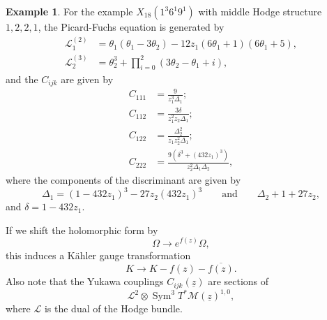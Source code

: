 \documentclass[10pt]{amsart}
\theoremstyle{definition}
\newtheorem{exm}[thm]{Example}
\theoremstyle{remark}
\theoremstyle{plain}
\theoremstyle{definition}
\theoremstyle{remark}
\newcommand{\mc}[1]{\mathcal{#1}}
\newcommand{\uz}{\ul{z}}
\newcommand{\on}[1]{\operatorname{#1}}
\newcommand{\ol}[1]{\overline{#1}}
\newcommand{\ul}[1]{\underline{#1}}
\newcommand{\1}{\mathbf{1}}
\newcommand{\2}{\mathbf{2}}
\newcommand{\3}{\mathbf{3}}
\begin{document}
\begin{exm}
    For the example $X_{18}(1^3 6^1 9^1)$ with middle Hodge structure $1,2,2,1$, the Picard-Fuchs equation is generated by
    \begin{align*}
        \mc{L}_1^{(2)} &= \theta_1 (\theta_1 - 3 \theta_2) - 12 z_1 (6 \theta_1 + 1) (6 \theta_1 + 5), \\
        \mc{L}_2^{(3)} &= \theta_2^3 + \prod_{i=0}^2 (3 \theta_2 - \theta_1 + i),
    \end{align*}
    and the $C_{ijk}$ are given by
    \begin{align*}
        C_{111} &= \frac{9}{z_1^3\Delta_1}; \\
        C_{112} &= \frac{3 \delta}{z_1^2 z_2 \Delta_1}; \\
        C_{122} &= \frac{\Delta_2^2}{z_1 z_2^2 \Delta_1}; \\
        C_{222} &= \frac{9(\delta^3 + (432z_1)^3)}{z_2^2 \Delta_1 \Delta_2},
    \end{align*}
    where the components of the discriminant are given by
    \[ \Delta_1 = (1-432z_1)^3 - 27z_2 (432z_1)^3 \qquad \text{and} \qquad \Delta_2 + 1 + 27 z_2, \]
    and $\delta = 1 - 432z_1$.
\end{exm}

If we shift the holomorphic form by
\[\Omega \to e^{f(z)} \Omega, \]
this induces a K\"ahler gauge transformation
\[ K \to K - f(z) - \ol{f(z)}. \]
Also note that the Yukawa couplings $C_{ijk}(\uz)$ are sections of
\[ \mc{L}^2 \otimes \on{Sym}^3 T^* \mc{M}(\uz)^{1,0}, \]
where $\mc{L}$ is the dual of the Hodge bundle.
\end{document}
